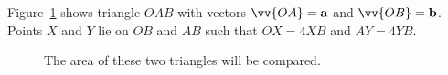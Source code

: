 \question %
Figure~\ref{fig:proof-of-parallel-lines} shows triangle $OAB$ with vectors $\vv{OA} = \vec{a}$ and $\vv{OB} = \vec{b}$. Points $X$ and $Y$ lie on $OB$ and $AB$ such that $OX = 4XB$ and $AY = 4YB$.

\begin{figure}[h]
    \centering
    \caption{The area of these two triangles will be compared.}
    \label{fig:proof-of-parallel-lines}
\end{figure}

